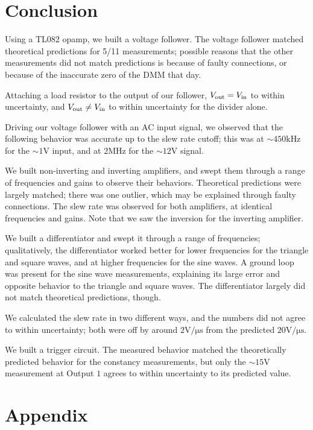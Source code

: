 \documentclass[11pt]{article}
\begin{document}
\section{Conclusion}

Using a TL082 opamp, we built a voltage follower.
The voltage follower matched theoretical predictions for
5/11 measurements; possible reasons that the other measurements
did not match predictions is because of faulty connections,
or because of the inaccurate zero of the DMM that day.

Attaching a load resistor to the output of our follower,
$V_{\rm out} = V_{\rm in}$ to within uncertainty, and
$V_{\rm out} \neq V_{\rm in}$ to within uncertainty
for the divider alone. 

Driving our voltage follower with an AC input signal,
we observed that the following behavior was accurate
up to the slew rate cutoff; this was at $\sim 450\si{\kilo\hertz}$
for the $\sim 1 \si{\volt}$ input, and at $2\si{\mega\hertz}$
for the $\sim 12 \si{\volt}$ signal.

We built non-inverting and inverting amplifiers, and swept
them through a range of frequencies and gains to observe their behaviors.
Theoretical predictions were largely matched; there was one outlier,
which may be explained through faulty connections. The
slew rate was observed for both amplifiers, at
identical frequencies and gains. Note that we saw the
inversion for the inverting amplifier.

We built a differentiator and swept it through a range
of frequencies; qualitatively, the differentiator worked
better for lower frequencies for the triangle and square
waves, and at higher frequencies for the sine waves.
A ground loop was present for the sine wave measurements,
explaining its large error and opposite behavior to the
triangle and square waves. The differentiator largely
did not match theoretical predictions, though.

We calculated the slew rate in two different ways,
and the numbers did not agree to within uncertainty;
both were off by around $2 \si{\volt}/\si{\micro\second}$
from the predicted $20\si{\volt}/\si{\micro\second}$.

We built a trigger circuit. The measured behavior matched
the theoretically predicted behavior for the constancy
measurements, but only the $\sim 15\si{\volt}$ measurement
at Output $1$ agrees to within uncertainty to its predicted value.

\newpage
\section{Appendix}
\end{document}
